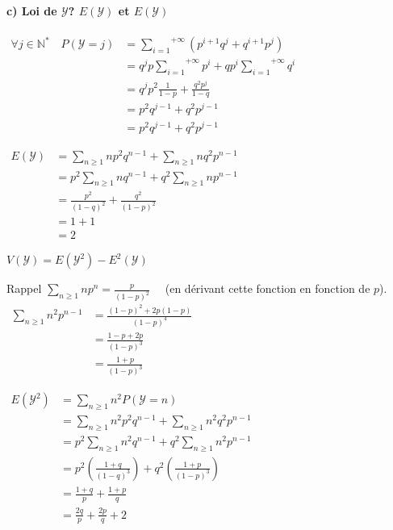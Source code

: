 \documentclass[a4paper, 12pt]{article}
\begin{document}
\paragraph{c) Loi de $\mathcal{Y}$? $E(\mathcal{Y})$ et $E(\mathcal{Y})$ \\}
\begin{flushleft}
$
\begin{aligned}
\forall j \in \mathbb{N}^* \quad P (\mathcal{Y} = j) &= \overset{+\infty}{\underset{i = 1}{\sum}} (p^{i + 1} q^j + q^{i + 1} p^j) \\
&= q^j p \overset{+\infty}{\underset{i = 1}{\sum}} p^i + qp^i \overset{+\infty}{\underset{i = 1}{\sum}} q^i \\
&= q^jp^2 \frac{1}{1 - p} + \frac{q^2 p^j}{1 - q} \\
&= p^2q^{j - 1} + q^2p^{j - 1} \\
&\boxed{= p^2 q^{j - 1} + q^2 p^{j - 1}}
\end{aligned}
$

$
\begin{aligned}
E(\mathcal{Y}) &= \underset{n \geq 1}{\sum} n p^2 q^{n - 1} + \underset{n \geq 1}{\sum} n q^2 p^{n - 1} \\
&= p^2 \underset{n \geq 1}{\sum} n q^{n - 1} + q^2 \underset{n \geq 1}{\sum} n p^{n - 1} \\
&= \frac{p^2}{(1 - q)^2} + \frac{q^2}{(1 - p)^2} \\
&= 1 + 1 \\
&\boxed{= 2}
\end{aligned}
$

$V(\mathcal{Y}) = E(\mathcal{Y}^2) - E^2(\mathcal{Y})$ \\

\begin{rappel}{Rappel}
$\underset{n \geq 1}{\sum} np^n = \frac{p}{(1 - p)^2} \quad$ (en dérivant cette fonction en fonction de $p$). \\

$
\begin{aligned}
\underset{n \geq 1}{\sum} n^2 p^{n - 1} &= \frac{(1 - p)^2 + 2p (1 - p)}{(1 - p)^4} \\
&= \frac{1 - p + 2p}{(1 - p)^3} \\
&\boxed{= \frac{1 + p}{(1 - p)^3}}
\end{aligned}
$
\end{rappel}

$
\begin{aligned}
E(\mathcal{Y}^2) &= \underset{n \geq 1}{\sum} n^2 P (\mathcal{Y} = n) \\
&= \underset{n \geq 1}{\sum} n^2 p^2 q^{n - 1} + \underset{n \geq 1}{\sum} n^2 q^2 p^{n - 1} \\
&= p^2 \underset{n \geq 1}{\sum} n^2 q^{n - 1} + q^2 \underset{n \geq 1}{\sum} n^2 p^{n - 1} \\
&= p^2 \left (\frac{1 + q}{(1 - q)^3} \right ) + q^2 \left (\frac{1 + p}{(1 - p)^3} \right ) \\
&= \frac{1 + q}{p} + \frac{1 + p}{q} \\
&\boxed{= \frac{2q}{p} + \frac{2p}{q} + 2}
\end{aligned}
$


\end{flushleft}
\end{document}
